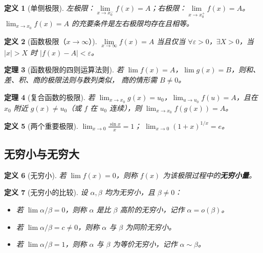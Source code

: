\documentclass[12pt,a4paper]{ctexart}
\newtheorem{theorem}{定理}[section]
\newtheorem{definition}[theorem]{定义}
\theoremstyle{remark}
\begin{document}
\begin{definition}[单侧极限]
左极限：$\lim\limits_{x\to x_0^-} f(x) = A$；右极限：$\lim\limits_{x\to x_0^+} f(x) = A$。
$\lim_{x\to x_0} f(x) = A$ 的充要条件是左右极限均存在且相等。
\end{definition}

\begin{definition}[函数极限（$x \to \infty$）]
$\lim\limits_{x\to\infty} f(x) = A$ 当且仅当
$\forall \varepsilon > 0$，$\exists X > 0$，当 $|x| > X$ 时 $|f(x)-A|<\varepsilon$。
\end{definition}

\begin{theorem}[函数极限的四则运算法则]
若 $\lim f(x) = A$，$\lim g(x) = B$，则和、差、积、商的极限法则与数列类似，
商的情形需 $B \neq 0$。
\end{theorem}

\begin{theorem}[复合函数的极限]
若 $\lim_{x\to x_0} g(x) = u_0$，$\lim_{u\to u_0} f(u) = A$，且在 $x_0$ 附近
$g(x) \neq u_0$（或 $f$ 在 $u_0$ 连续），则 $\lim_{x\to x_0} f(g(x)) = A$。
\end{theorem}

\begin{definition}[两个重要极限]
$\displaystyle\lim_{x\to 0}\frac{\sin x}{x}=1$；
$\displaystyle\lim_{x\to 0}(1+x)^{1/x}=e$。
\end{definition}

\subsection{无穷小与无穷大}

\begin{definition}[无穷小]
若 $\lim f(x) = 0$，则称 $f(x)$ 为该极限过程中的\textbf{无穷小量}。
\end{definition}

\begin{definition}[无穷小的比较]
设 $\alpha,\beta$ 均为无穷小，且 $\beta \neq 0$：
\begin{itemize}
  \item 若 $\lim \alpha/\beta = 0$，则称 $\alpha$ 是比 $\beta$ 高阶的无穷小，记作 $\alpha = o(\beta)$。
  \item 若 $\lim \alpha/\beta = c \neq 0$，则称 $\alpha$ 与 $\beta$ 为同阶无穷小。
  \item 若 $\lim \alpha/\beta = 1$，则称 $\alpha$ 与 $\beta$ 为等价无穷小，记作 $\alpha \sim \beta$。
\end{itemize}
\end{definition}
\end{document}
